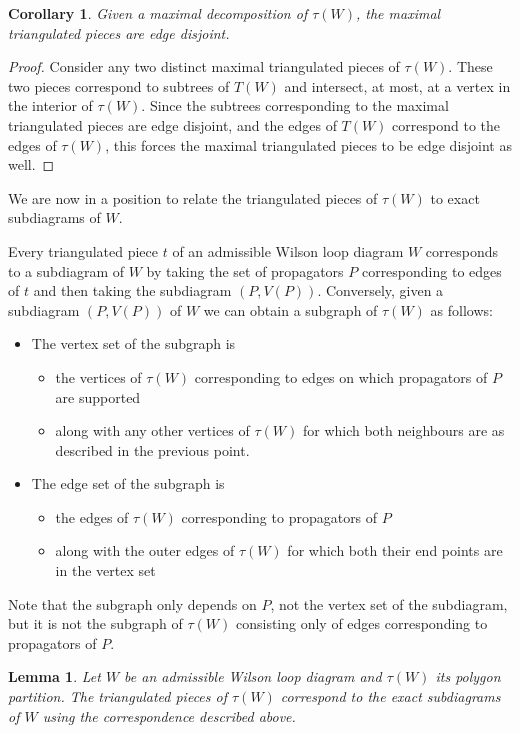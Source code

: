\documentclass[11pt]{article}
\newtheorem{lem}[thm]{Lemma}
\newtheorem{cor}[thm]{Corollary}
\theoremstyle{remark}
\theoremstyle{definition}
\begin{document}
\begin{cor} \label{maxtriangdisjointcor}
Given a maximal decomposition of $\tau(W)$, the maximal triangulated pieces are edge disjoint.
\end{cor}

\begin{proof}
Consider any two distinct maximal triangulated pieces of $\tau(W)$. These two pieces correspond to subtrees of $T(W)$ and intersect, at most, at a vertex in the interior of $\tau(W)$. Since the subtrees corresponding to the maximal triangulated pieces are edge disjoint, and the edges of $T(W)$ correspond to the edges of $\tau(W)$, this forces the maximal triangulated pieces to be edge disjoint as well.
\end{proof}


We are now in a position to relate the triangulated pieces of $\tau(W)$ to exact subdiagrams of $W$.

Every triangulated piece $t$ of an admissible Wilson loop diagram $W$ corresponds to a subdiagram of $W$ by taking the set of propagators $P$ corresponding to edges of $t$ and then taking the subdiagram $(P, V(P))$.  Conversely, given a subdiagram $(P, V(P))$ of $W$ we can obtain a subgraph of $\tau(W)$ as follows:
\begin{itemize}
\item The vertex set of the subgraph is
  \begin{itemize}
  \item the vertices of $\tau(W)$ corresponding to edges on which propagators of $P$ are supported
  \item along with any other vertices of $\tau(W)$ for which both neighbours are as described in the previous point.
  \end{itemize}
\item The edge set of the subgraph is
  \begin{itemize}
  \item the edges of $\tau(W)$ corresponding to propagators of $P$
  \item along with the outer edges of $\tau(W)$ for which both their end points are in the vertex set
  \end{itemize}
\end{itemize}
Note that the subgraph only depends on $P$, not the vertex set of the subdiagram, but it is not the subgraph of $\tau(W)$ consisting only of edges corresponding to propagators of $P$.


\begin{lem}\label{lem triang to exact}
  Let $W$ be an admissible Wilson loop diagram and $\tau(W)$ its polygon partition.  The triangulated pieces of $\tau(W)$ correspond to the exact subdiagrams of $W$ using the correspondence described above.
\end{lem}
\end{document}
